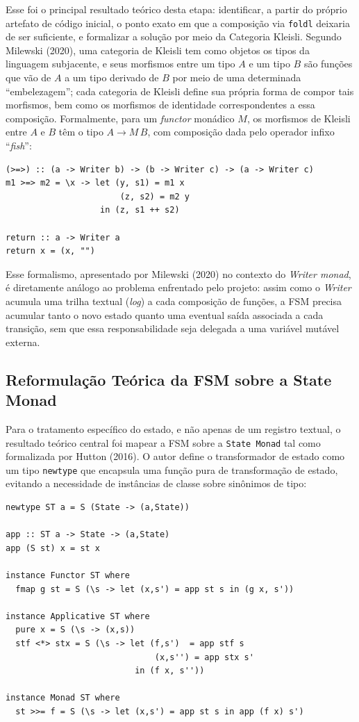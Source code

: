 \documentclass[12pt,a4paper]{article}
\begin{document}
Esse foi o principal resultado teórico desta etapa: identificar, a partir do próprio artefato de código inicial, o ponto exato em que a composição via \texttt{foldl} deixaria de ser suficiente, e formalizar a solução por meio da Categoria Kleisli. Segundo Milewski (2020), uma categoria de Kleisli tem como objetos os tipos da linguagem subjacente, e seus morfismos entre um tipo $A$ e um tipo $B$ são funções que vão de $A$ a um tipo derivado de $B$ por meio de uma determinada ``embelezagem''; cada categoria de Kleisli define sua própria forma de compor tais morfismos, bem como os morfismos de identidade correspondentes a essa composição. Formalmente, para um \textit{functor} monádico $M$, os morfismos de Kleisli entre $A$ e $B$ têm o tipo $A \to M\,B$, com composição dada pelo operador infixo ``\textit{fish}'':

\begin{verbatim}
(>=>) :: (a -> Writer b) -> (b -> Writer c) -> (a -> Writer c)
m1 >=> m2 = \x -> let (y, s1) = m1 x
                       (z, s2) = m2 y
                   in (z, s1 ++ s2)

return :: a -> Writer a
return x = (x, "")
\end{verbatim}

Esse formalismo, apresentado por Milewski (2020) no contexto do \textit{Writer monad}, é diretamente análogo ao problema enfrentado pelo projeto: assim como o \textit{Writer} acumula uma trilha textual (\textit{log}) a cada composição de funções, a FSM precisa acumular tanto o novo estado quanto uma eventual saída associada a cada transição, sem que essa responsabilidade seja delegada a uma variável mutável externa.

\subsection{Reformulação Teórica da FSM sobre a State Monad}

Para o tratamento específico do estado, e não apenas de um registro textual, o resultado teórico central foi mapear a FSM sobre a \texttt{State Monad} tal como formalizada por Hutton (2016). O autor define o transformador de estado como um tipo \texttt{newtype} que encapsula uma função pura de transformação de estado, evitando a necessidade de instâncias de classe sobre sinônimos de tipo:

\begin{verbatim}
newtype ST a = S (State -> (a,State))

app :: ST a -> State -> (a,State)
app (S st) x = st x

instance Functor ST where
  fmap g st = S (\s -> let (x,s') = app st s in (g x, s'))

instance Applicative ST where
  pure x = S (\s -> (x,s))
  stf <*> stx = S (\s -> let (f,s')  = app stf s
                              (x,s'') = app stx s'
                          in (f x, s''))

instance Monad ST where
  st >>= f = S (\s -> let (x,s') = app st s in app (f x) s')
\end{verbatim}
\end{document}
